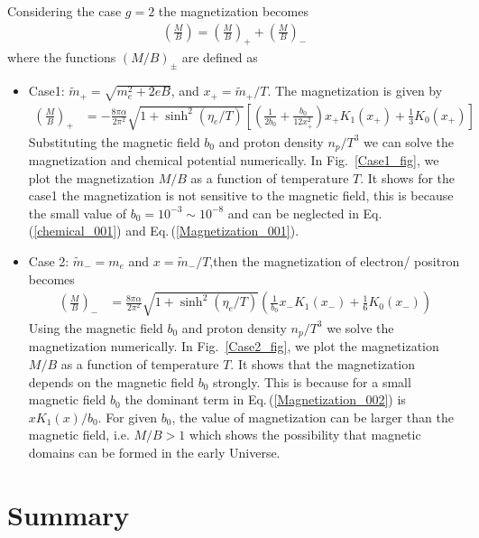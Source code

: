 \documentclass[universe,article,submit,moreauthors,pdftex,a4paper]{Definitions/mdpi}
\newcommand{\req}[1]{Eq.\,(\ref{#1})}
\newcommand*{\rf}[1]{Fig.~{\ref{#1}}}
\begin{document}
Considering the case $g=2$ the magnetization becomes
\begin{align}
\left(\frac{M}{B}\right)=\left(\frac{M}{B}\right)_++\left(\frac{M}{B}\right)
_-
\end{align}
where the functions $(M/B)_\pm$ are defined as 
\begin{itemize}
  \item Case1: $\tilde m_+=\sqrt{m^2_e+2eB}$, and $x_+=\tilde m_+/T$. The magnetization is given by
  \begin{align}\label{Magnetization_001}
 \left(\frac{M}{B}\right)_+&=-\frac{8\pi\alpha}{2\pi^2}\sqrt{1+\sinh^2(\eta_e/T)}\left[\left(\frac{1}{2b_0}+\frac{b_0}{12x_+^2}\right)x_+K_1(x_+)+\frac{1}{3}K_0(x_+)\right]
   \end{align}
Substituting the magnetic field $b_0$ and proton density $n_p/T^3$  we can solve the magnetization and chemical potential numerically. In \rf{Case1_fig}, we plot the  magnetization $M/B$ as a function of temperature $T$. It shows for the case1 the magnetization is not sensitive to the magnetic field, this is because the small value of $b_0=10^{-3}\sim10^{-8}$ and can be neglected in \req{chemical_001} and \req{Magnetization_001}.
\\
  \item Case 2: $\tilde m_-=m_e$ and $x=\tilde m_-/T$,then the magnetization of electron/ positron becomes
\begin{align}\label{Magnetization_002}
\left(\frac{M}{B}\right)_-&=\frac{8\pi\alpha}{2\pi^2}\sqrt{1+\sinh^2(\eta_e/T)}\left(\frac{1}{b_0}x_-K_1(x_-)+\frac{1}{6}K_0(x_-)\right)
\end{align}
Using the magnetic field $b_0$ and proton density $n_p/T^3$ we solve the magnetization  numerically. In \rf{Case2_fig}, we plot the  magnetization $M/B$ as a function of temperature $T$. It shows that the magnetization depends on the magnetic field $b_0$ strongly. This is because for a small magnetic field $b_0$ the dominant term in \req{Magnetization_002} is $xK_1(x)/b_0$. For given $b_0$, the value of magnetization can be larger than the magnetic field, i.e. $M/B>1$  which shows the possibility that magnetic domains can be formed in the early Universe.
\end{itemize}

\section{Summary}\label{Summary}
\end{document}
